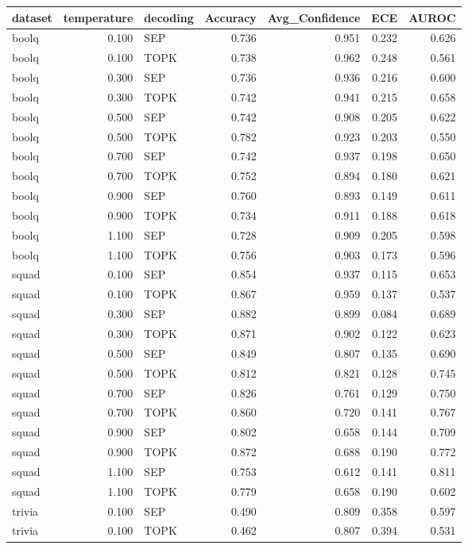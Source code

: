 \begin{tabular}{lrlrrrr}
\toprule
dataset & temperature & decoding & Accuracy & Avg_Confidence & ECE & AUROC \\
\midrule
boolq & 0.100 & SEP & 0.736 & 0.951 & 0.232 & 0.626 \\
boolq & 0.100 & TOPK & 0.738 & 0.962 & 0.248 & 0.561 \\
boolq & 0.300 & SEP & 0.736 & 0.936 & 0.216 & 0.600 \\
boolq & 0.300 & TOPK & 0.742 & 0.941 & 0.215 & 0.658 \\
boolq & 0.500 & SEP & 0.742 & 0.908 & 0.205 & 0.622 \\
boolq & 0.500 & TOPK & 0.782 & 0.923 & 0.203 & 0.550 \\
boolq & 0.700 & SEP & 0.742 & 0.937 & 0.198 & 0.650 \\
boolq & 0.700 & TOPK & 0.752 & 0.894 & 0.180 & 0.621 \\
boolq & 0.900 & SEP & 0.760 & 0.893 & 0.149 & 0.611 \\
boolq & 0.900 & TOPK & 0.734 & 0.911 & 0.188 & 0.618 \\
boolq & 1.100 & SEP & 0.728 & 0.909 & 0.205 & 0.598 \\
boolq & 1.100 & TOPK & 0.756 & 0.903 & 0.173 & 0.596 \\
squad & 0.100 & SEP & 0.854 & 0.937 & 0.115 & 0.653 \\
squad & 0.100 & TOPK & 0.867 & 0.959 & 0.137 & 0.537 \\
squad & 0.300 & SEP & 0.882 & 0.899 & 0.084 & 0.689 \\
squad & 0.300 & TOPK & 0.871 & 0.902 & 0.122 & 0.623 \\
squad & 0.500 & SEP & 0.849 & 0.807 & 0.135 & 0.690 \\
squad & 0.500 & TOPK & 0.812 & 0.821 & 0.128 & 0.745 \\
squad & 0.700 & SEP & 0.826 & 0.761 & 0.129 & 0.750 \\
squad & 0.700 & TOPK & 0.860 & 0.720 & 0.141 & 0.767 \\
squad & 0.900 & SEP & 0.802 & 0.658 & 0.144 & 0.709 \\
squad & 0.900 & TOPK & 0.872 & 0.688 & 0.190 & 0.772 \\
squad & 1.100 & SEP & 0.753 & 0.612 & 0.141 & 0.811 \\
squad & 1.100 & TOPK & 0.779 & 0.658 & 0.190 & 0.602 \\
trivia & 0.100 & SEP & 0.490 & 0.809 & 0.358 & 0.597 \\
trivia & 0.100 & TOPK & 0.462 & 0.807 & 0.394 & 0.531 \\

\end{tabular}
